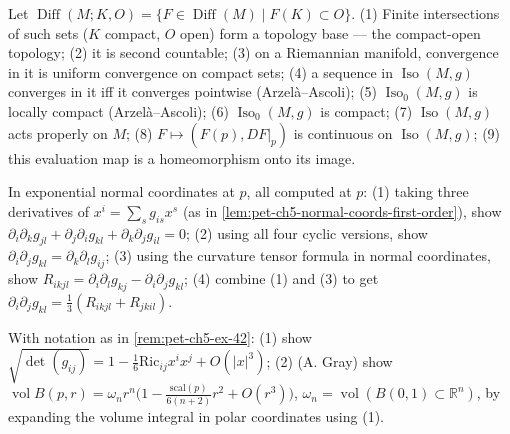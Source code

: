 \begin{remark}
  \label{rem:pet-ch5-ex-41}

  Let $\operatorname{Diff}(M;K,O)=\{F\in\operatorname{Diff}(M)\mid F(K)\subset O\}$.
  (1) Finite intersections of such sets ($K$ compact, $O$ open) form a topology
  base — the compact-open topology; (2) it is second countable; (3) on a
  Riemannian manifold, convergence in it is uniform convergence on compact sets;
  (4) a sequence in $\operatorname{Iso}(M,g)$ converges in it iff it converges
  pointwise (Arzelà–Ascoli); (5) $\operatorname{Iso}_0(M,g)$ is locally compact
  (Arzelà–Ascoli); (6) $\operatorname{Iso}_0(M,g)$ is compact; (7)
  $\operatorname{Iso}(M,g)$ acts properly on $M$; (8) $F\mapsto(F(p),DF|_p)$ is
  continuous on $\operatorname{Iso}(M,g)$; (9) this evaluation map is a
  homeomorphism onto its image.
\end{remark}

\begin{remark}
  \label{rem:pet-ch5-ex-42}

  In exponential normal coordinates at $p$, all computed at $p$: (1) taking three
  derivatives of $x^i=\sum_sg_{is}x^s$ (as in
  \cref{lem:pet-ch5-normal-coords-first-order}), show
  $\partial_i\partial_kg_{jl}+\partial_j\partial_ig_{kl}+\partial_k\partial_jg_{il}=0$;
  (2) using all four cyclic versions, show
  $\partial_i\partial_jg_{kl}=\partial_k\partial_lg_{ij}$; (3) using the curvature
  tensor formula in normal coordinates, show
  $R_{ikjl}=\partial_i\partial_lg_{kj}-\partial_i\partial_jg_{kl}$; (4) combine (1)
  and (3) to get $\partial_i\partial_jg_{kl}=\tfrac13(R_{ikjl}+R_{jkil})$.
\end{remark}

\begin{remark}
  \label{rem:pet-ch5-ex-43}

  With notation as in \cref{rem:pet-ch5-ex-42}: (1) show
  $\sqrt{\det(g_{ij})}=1-\tfrac16\mathrm{Ric}_{ij}x^ix^j+O(|x|^3)$; (2) (A. Gray)
  show $\operatorname{vol}B(p,r)=\omega_nr^n\big(1-\tfrac{\mathrm{scal}(p)}{6(n+2)}r^2
  +O(r^3)\big)$, $\omega_n=\operatorname{vol}(B(0,1)\subset\mathbb R^n)$, by
  expanding the volume integral in polar coordinates using (1).
\end{remark}
